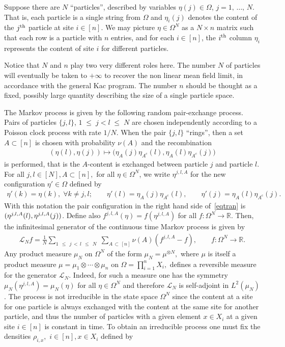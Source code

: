 \documentclass[AHL,Unicode,longabstracts,published]{cedram}
\renewcommand{\leq}{\;\leqslant\;}
\newcommand{\cL}{\mathcal{L}}
\newcommand{\bbR}{\mathbb{R}}
\let\O=\Omega
\let\oldforall\forall
\renewcommand*{\forall}{\mathrel{\oldforall}}
\begin{document}
Suppose there are $N$ ``particles'', described by variables $\eta(j)\in\O$, $j=1,\,\dots,\,N$. That is, each particle is a single string from $\O$ and $\eta_i(j)$ denotes the content of the $j^{\rm th}$ particle at site $i\in[n]$. We may picture $\eta\in\O^N$ as a $N\times n$ matrix such that each row is a particle with $n$ entries, and for each $i\in[n]$, the $i^{\rm th}$ column $\eta_i$ represents the content of site $i$ for different particles.

Notice that $N$ and $n$ play two very different roles here. The number $N$ of particles will eventually be taken to $+\infty$ to recover the non linear mean field limit, in accordance with the general Kac program. The number $n$ should be thought as a fixed, possibly large quantity describing the size of a single particle space.

The Markov process is given by the following random pair-exchange process. Pairs of particles $\{j,l\}$, $1\leq j<l\leq N$ are chosen independently according to a Poisson clock process with rate $1/N$. When the pair $\{j,l\}$ ``rings'', then a set $A\subset[n]$ is chosen with probability $\nu(A)$ and the recombination
\begin{align}\label{eqtran}
(\eta(l),\eta(j)) \mapsto \big(\eta_A(j)\eta_{A^c}(l),\eta_A(l)\eta_{A^c}(j)\big)
\end{align}
is performed, that is the $A$-content is exchanged between particle $j$ and particle $l$. For all $j,l \in [N], A \subset [n],$ for all $\eta \in \Omega^N$, we write $\eta^{j,l,A}$ for the new configuration $\eta' \in \Omega$ defined by
\begin{align}\label{def:etajl}
\eta'(k)=\eta(k), \;\forall k \neq j,l;\qquad \eta'(l)=\eta_{A}(j)\eta_{A^c}(l),\qquad \eta'(j)=\eta_A(l)\eta_{A^c}(j).
\end{align}
With this notation the pair configuration in the right hand side of~\eqref{eqtran} is $(\eta^{j,l,A}(l),\linebreak\eta^{j,l,A}(j))$. Define also $f^{j,l,A}(\eta)=f(\eta^{j,l,A})$ for all $f:\Omega^N \rightarrow \bbR$. Then, the infinitesimal generator of the continuous time Markov process is given by
\begin{align}\label{operator}
\cL_N f = \frac{1}{N}\sum_{1\,\leq\,j\,<\,l\,\leq\,N}\;\sum_{A\,\subset\,[n]}\nu(A)\left(f^{j,l,A}-f\right), \qquad f:\Omega^N \rightarrow \bbR.
\end{align}
Any product measure $\mu_N$ on $\Omega^N$ of the form $\mu_N = \mu^{\otimes N},$ where $\mu$ is itself a product measure $\mu=\mu_1\otimes\cdots\otimes\mu_n$ on $\Omega=\prod_{i=1}^nX_i,$ defines a reversible measure for the generator $\cL_N$. Indeed, for such a measure one has the symmetry $\mu_N(\eta^{j,l,A})=\mu_N(\eta)$ for all $\eta\in\O^N$ and therefore $\cL_N$ is self-adjoint in $L^2(\mu_N)$. The process is not irreducible in the state space $\Omega^N$ since the content at a site for one particle is always exchanged with the content at the same site for another particle, and thus the number of particles with a given element $x \in X_i$ at a given site $i \in [n]$ is constant in time. To obtain an irreducible process one must fix the densities $\rho_{i,x},$ $i \in [n],x\in X_i$ defined by
\end{document}
